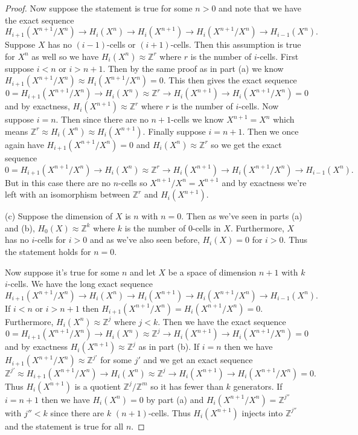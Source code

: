 \documentclass{article}
\begin{document}
\begin{proof}
Now suppose the statement is true for some $n>0$ and note that we have the exact sequence
\[
H_{i+1}(X^{n+1}/X^n) \to H_i(X^n) \to H_i(X^{n+1}) \to H_i(X^{n+1}/X^n) \to H_{i-1}(X^n).
\]
Suppose $X$ has no $(i-1)$-cells or $(i+1)$-cells. Then this assumption is true for $X^n$ as well so we have $H_i(X^n) \approx \mathbb{Z}^r$ where $r$ is the number of $i$-cells. First suppose $i < n$ or $i > n+1$. Then by the same proof as in part (a) we know $H_{i+1}(X^{n+1}/X^n) \approx H_i(X^{n+1}/X^n) = 0$. This then gives the exact sequence
\[
0 = H_{i+1}(X^{n+1}/X^n) \to H_i(X^n) \approx \mathbb{Z}^r \to H_i(X^{n+1}) \to H_i(X^{n+1}/X^n) = 0
\]
and by exactness, $H_i(X^{n+1}) \approx \mathbb{Z}^r$ where $r$ is the number of $i$-cells. Now suppose $i = n$. Then since there are no $n+1$-cells we know $X^{n+1} = X^n$ which means $\mathbb{Z}^r \approx H_i(X^n) \approx H_i(X^{n+1})$. Finally suppose $i = n+1$. Then we once again have $H_{i+1}(X^{n+1}/X^n) = 0$ and $H_i(X^n) \approx \mathbb{Z}^r$ so we get the exact sequence
\[
0 = H_{i+1}(X^{n+1}/X^n) \to H_i(X^n) \approx \mathbb{Z}^r \to H_i(X^{n+1}) \to H_i(X^{n+1}/X^n) \to H_{i-1}(X^n).
\]
But in this case there are no $n$-cells so $X^{n+1}/X^n = X^{n+1}$ and by exactness we're left with an isomorphism between $\mathbb{Z}^r$ and $H_i(X^{n+1})$.

(c) Suppose the dimension of $X$ is $n$ with $n = 0$. Then as we've seen in parts (a) and (b), $H_0(X) \approx \mathbb{Z}^k$ where $k$ is the number of $0$-cells in $X$. Furthermore, $X$ has no $i$-cells for $i > 0$ and as we've also seen before, $H_i(X) = 0$ for $i > 0$. Thus the statement holds for $n = 0$.

Now suppose it's true for some $n$ and let $X$ be a space of dimension $n+1$ with $k$ $i$-cells. We have the long exact sequence
\[
H_{i+1}(X^{n+1}/X^n) \to H_i(X^n) \to H_i(X^{n+1}) \to H_i(X^{n+1}/X^n) \to H_{i-1}(X^n).
\]
If $i < n$ or $i > n+1$ then $H_{i+1}(X^{n+1}/X^n) = H_i(X^{n+1}/X^n) = 0$. Furthermore, $H_i(X^n) \approx \mathbb{Z}^j$ where $j < k$. Then we have the exact sequence
\[
0 = H_{i+1}(X^{n+1}/X^n) \to H_i(X^n) \approx \mathbb{Z}^j \to H_i(X^{n+1}) \to H_i(X^{n+1}/X^n) = 0
\]
and by exactness $H_i(X^{n+1}) \approx \mathbb{Z}^j$ as in part (b). If $i = n$ then we have $H_{i+1}(X^{n+1}/X^n) \approx \mathbb{Z}^{j'}$ for some $j'$ and we get an exact sequence
\[
\mathbb{Z}^{j'} \approx H_{i+1}(X^{n+1}/X^n) \to H_i(X^n) \approx \mathbb{Z}^j \to H_i(X^{n+1}) \to H_i(X^{n+1}/X^n) = 0.
\]
Thus $H_i(X^{n+1})$ is a quotient $\mathbb{Z}^j/\mathbb{Z}^{m}$ so it has fewer than $k$ generators. If $i = n+1$ then we have $H_i(X^n) = 0$ by part (a) and $H_i(X^{n+1}/X^n) = \mathbb{Z}^{j''}$ with $j'' < k$ since there are $k$ $(n+1)$-cells. Thus $H_i(X^{n+1})$ injects into $\mathbb{Z}^{j''}$ and the statement is true for all $n$.
\end{proof}
\end{document}
